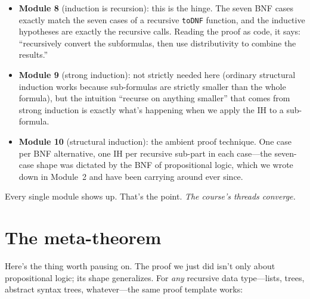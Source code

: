 \documentclass[11pt]{article}
\begin{document}
\begin{itemize}
  \item \textbf{Module 8} (induction is recursion): this is the hinge. The seven BNF cases exactly match the seven cases of a recursive \texttt{toDNF} function, and the inductive hypotheses are exactly the recursive calls. Reading the proof as code, it says: ``recursively convert the subformulas, then use distributivity to combine the results.''
  \item \textbf{Module 9} (strong induction): not strictly needed here (ordinary structural induction works because sub-formulas are strictly smaller than the whole formula), but the intuition ``recurse on anything smaller'' that comes from strong induction is exactly what's happening when we apply the IH to a sub-formula.
  \item \textbf{Module 10} (structural induction): the ambient proof technique. One case per BNF alternative, one IH per recursive sub-part in each case---the seven-case shape was dictated by the BNF of propositional logic, which we wrote down in Module~2 and have been carrying around ever since.
\end{itemize}

Every single module shows up. That's the point. \emph{The course's threads converge.}

\section*{The meta-theorem}

Here's the thing worth pausing on. The proof we just did isn't only about propositional logic; its shape generalizes. For \emph{any} recursive data type---lists, trees, abstract syntax trees, whatever---the same proof template works:

\begin{center}
\end{center}
\end{document}
